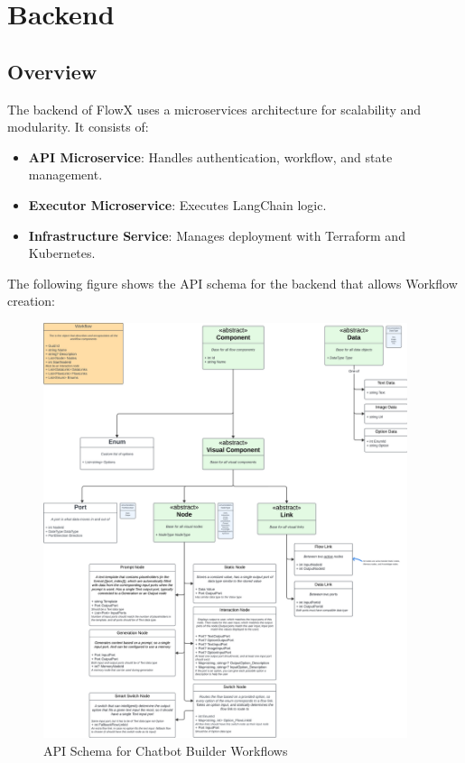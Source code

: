 \section{Backend}

\subsection{Overview}
The backend of FlowX uses a microservices architecture for scalability and modularity. It consists of:
\begin{itemize}
\item \textbf{API Microservice}: Handles authentication, workflow, and state management.
\item \textbf{Executor Microservice}: Executes LangChain logic.
\item \textbf{Infrastructure Service}: Manages deployment with Terraform and Kubernetes.
\end{itemize}

The following figure shows the API schema for the backend that allows Workflow creation:
\begin{figure}[H]
    \centering
    \includegraphics[width=0.95\textwidth]{assets/ChatbotBuilderApiSchema}
    \caption{API Schema for Chatbot Builder Workflows}
    \label{fig:api_schema}
\end{figure}

